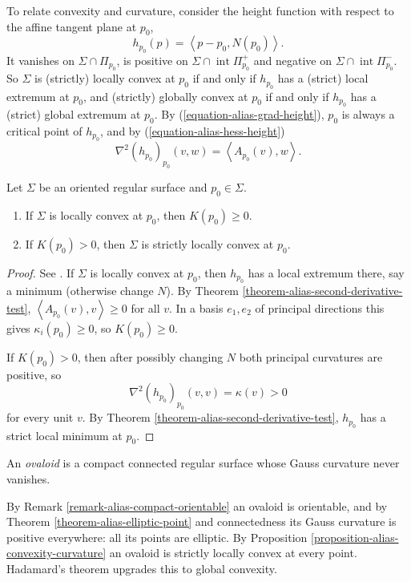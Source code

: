 To relate convexity and curvature,
consider the height function with respect
to the affine tangent plane at $p_0$,
$$
h_{p_0}(p)=\left\langle{} p-p_0,N(p_0)
\right\rangle{}.
$$
It vanishes on $\Sigma\cap\Pi_{p_0}$, is
positive on $\Sigma\cap
\operatorname{int}\Pi_{p_0}^+$ and
negative on $\Sigma\cap
\operatorname{int}\Pi_{p_0}^-$. So
$\Sigma$ is (strictly) locally convex at
$p_0$ if and only if $h_{p_0}$ has a
(strict) local extremum at $p_0$, and
(strictly) globally convex at $p_0$ if
and only if $h_{p_0}$ has a (strict)
global extremum at $p_0$. By
(\ref{equation-alias-grad-height}), $p_0$
is always a critical point of $h_{p_0}$,
and by (\ref{equation-alias-hess-height})
$$
\nabla^2(h_{p_0})_{p_0}(v,w)
=\left\langle{} A_{p_0}(v),w
\right\rangle{}.
$$

\begin{proposition}
\label{proposition-alias-convexity-curvature}
Let $\Sigma$ be an oriented regular
surface and $p_0\in\Sigma$.
\begin{enumerate}
\item If $\Sigma$ is locally convex at
$p_0$, then $K(p_0)\geq 0$.
\item If $K(p_0)>0$, then $\Sigma$ is
strictly locally convex at $p_0$.
\end{enumerate}
\end{proposition}

\begin{proof}
See \cite[Proposition 2.5,
pp.~17--18]{alias2006analisis}.
If $\Sigma$ is
locally convex at $p_0$, then $h_{p_0}$
has a local extremum there, say a minimum
(otherwise change $N$). By Theorem
\ref{theorem-alias-second-derivative-test},
$\left\langle{} A_{p_0}(v),v
\right\rangle{}\geq 0$ for all $v$. In a
basis $e_1,e_2$ of principal directions
this gives $\kappa_i(p_0)\geq 0$, so
$K(p_0)\geq 0$.

If $K(p_0)>0$, then after possibly
changing $N$ both principal curvatures are
positive, so
$$
\nabla^2(h_{p_0})_{p_0}(v,v)
=\kappa(v)>0
$$
for every unit $v$. By Theorem
\ref{theorem-alias-second-derivative-test},
$h_{p_0}$ has a strict local minimum at
$p_0$.
\end{proof}

\begin{definition}
\label{definition-alias-ovaloid}
An \emph{ovaloid} is a compact connected
regular surface whose Gauss curvature
never vanishes.
\end{definition}

By Remark
\ref{remark-alias-compact-orientable} an
ovaloid is orientable, and by Theorem
\ref{theorem-alias-elliptic-point} and
connectedness its Gauss curvature is
positive everywhere: all its points are
elliptic. By Proposition
\ref{proposition-alias-convexity-curvature}
an ovaloid is strictly locally convex at
every point. Hadamard's theorem upgrades
this to global convexity.

